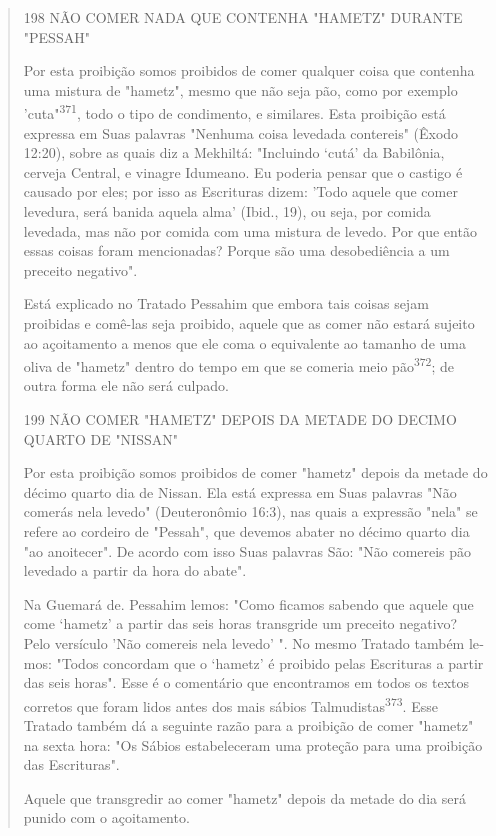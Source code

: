 \begin{quote}198 NÃO COMER NADA QUE CONTENHA "HAMETZ" DURANTE "PESSAH"

Por esta proibição somos proibidos de comer qualquer coisa que con­tenha
uma mistura de "hametz", mesmo que não seja pão, como por exemplo
'cuta"\textsuperscript{371}, todo o tipo de condimento, e similares.
Esta proibição está expres­sa em Suas palavras "Nenhuma coisa levedada
contereis" (Êxodo 12:20), sobre as quais diz a Mekhiltá: "Incluindo
`cutá' da Babilônia, cerveja Central, e vina­gre Idumeano. Eu poderia
pensar que o castigo é causado por eles; por isso as Escrituras dizem:
'Todo aquele que comer levedura, será banida aquela al­ma' (Ibid., 19),
ou seja, por comida levedada, mas não por comida com uma mistura de
levedo. Por que então essas coisas foram mencionadas? Porque são uma
desobediência a um preceito negativo".

Está explicado no Tratado Pessahim que embora tais coisas sejam
proibidas e comê-las seja proibido, aquele que as comer não estará
sujeito ao açoitamento a menos que ele coma o equivalente ao tamanho de
uma oliva de "hametz" dentro do tempo em que se comeria meio
pão\textsuperscript{372}; de outra forma ele não será culpado.

199 NÃO COMER "HAMETZ" DEPOIS DA METADE DO DECIMO QUARTO DE "NISSAN"

Por esta proibição somos proibidos de comer "hametz" depois da metade do
décimo quarto dia de Nissan. Ela está expressa em Suas palavras "Não
comerás nela levedo" (Deuteronômio 16:3), nas quais a expressão "nela"
se refere ao cordeiro de "Pessah", que devemos abater no décimo quarto
dia "ao anoitecer". De acordo com isso Suas palavras São: "Não comereis
pão leveda­do a partir da hora do abate".

Na Guemará de. Pessahim lemos: "Como ficamos sabendo que aque­le que
come `hametz' a partir das seis horas transgride um preceito negativo?
Pelo versículo 'Não comereis nela levedo' ". No mesmo Tratado também
le­mos: "Todos concordam que o `hametz' é proibido pelas Escrituras a
partir das seis horas". Esse é o comentário que encontramos em todos os
textos corretos que foram lidos antes dos mais sábios
Talmudistas\textsuperscript{373}. Esse Tratado também dá a seguinte
razão para a proibição de comer "hametz" na sexta hora: "Os Sábios
estabeleceram uma proteção para uma proibição das Escrituras".

Aquele que transgredir ao comer "hametz" depois da metade do dia será
punido com o açoitamento.
\end{quote}

